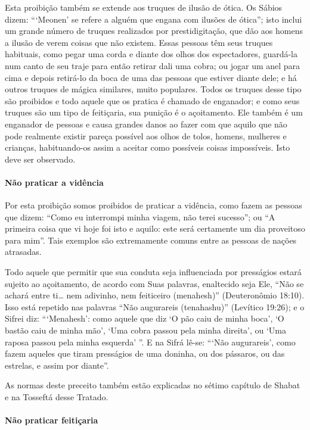 Esta proibição também se extende aos truques de ilusão de ótica. Os
Sábios dizem: ```Meonen' se refere a alguém que engana com ilusões de
ótica''; isto inclui um grande número de truques realizados por
prestidigitação, que dão aos homens a ilusão de verem coisas que não
existem. Essas pessoas têm seus truques habituais, como pegar uma corda
e diante dos olhos dos espectadores, guardá-la num canto de seu traje
para então retirar dali uma cobra; ou jogar um anel para cima e depois
retirá-lo da boca de uma das pessoas que estiver diante dele; e há
outros truques de mágica similares, muito populares. Todos os truques
desse tipo são proibidos e todo aquele que os pratica é chamado de
enganador; e como seus truques são um tipo de feitiçaria, sua punição é
o açoitamento. Ele também é um enganador de pessoas e causa grandes
danos ao fazer com que aquilo que não pode realmente existir pareça
possível aos olhos de tolos, homens, mulheres e crianças, habituando-os assim a
aceitar como possíveis coisas impossíveis. Isto deve ser observado.

\paragraph{Não praticar a vidência}

Por esta proibição somos proibidos de praticar a vidência, como fazem
as pessoas que dizem: ``Como eu interrompi minha viagem, não terei
sucesso''; ou ``A primeira coisa que vi hoje foi isto e aquilo: este
será certamente um dia proveitoso para mim''. Tais exemplos são
extremamente comuns entre as pessoas de nações atrasadas.

Todo aquele que permitir que sua conduta seja influenciada por
presságios estará sujeito ao açoitamento, de acordo com Suas palavras,
enaltecido seja Ele, ``Não se achará entre ti\ldots{} nem adivinho, nem
feiticeiro (menahesh)'' (Deuteronômio 18:10). Isso está repetido nas
palavras ``Não augurareis (tenahashu)'' (Levítico 19:26); e o Sifrei
diz: ```Menahesh': como aquele que diz `O pão caiu de minha boca', `O
bastão caiu de minha mão', `Uma cobra passou pela minha direita', ou
`Uma raposa passou pela minha esquerda' ''. E na Sifrá lê-se: ```Não
augurareis', como fazem aqueles que tiram presságios de uma doninha, ou
dos pássaros, ou das estrelas, e assim por diante''.

As normas deste preceito também estão explicadas no sétimo capítulo de
Shabat e na Tosseftá desse Tratado.

\paragraph{Não praticar feitiçaria}

